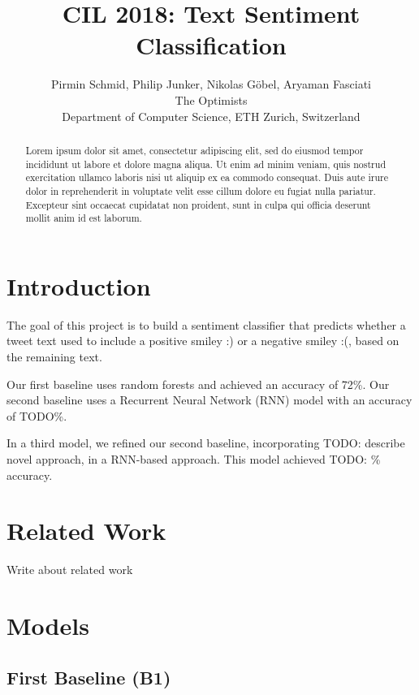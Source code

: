 \documentclass[10pt,conference,compsocconf]{IEEEtran}
\newcommand{\todo}[1]{}
\renewcommand{\todo}[1]{{\color{red} TODO: {#1}}}
\begin{document}
\title{CIL 2018: Text Sentiment Classification}

\author{
  Pirmin Schmid, Philip Junker, Nikolas Göbel, Aryaman Fasciati\\
  The Optimists\\
  Department of Computer Science, ETH Zurich, Switzerland
}

\maketitle

\begin{abstract}
  Lorem ipsum dolor sit amet, consectetur adipiscing elit, sed do
  eiusmod tempor incididunt ut labore et dolore magna aliqua. Ut enim ad
  minim veniam, quis nostrud exercitation ullamco laboris nisi ut
  aliquip ex ea commodo consequat. Duis aute irure dolor in
  reprehenderit in voluptate velit esse cillum dolore eu fugiat nulla
  pariatur. Excepteur sint occaecat cupidatat non proident, sunt in
  culpa qui officia deserunt mollit anim id est laborum.
\end{abstract}


\section{Introduction}

The goal of this project is to build a sentiment classifier
that predicts whether a tweet text used to include a
positive smiley :) or a negative smiley :(,
based on the remaining text.

Our first baseline uses random forests and achieved an accuracy of 72\%.
Our second baseline uses a Recurrent Neural Network (RNN) model with
an accuracy of TODO\%.

In a third model, we refined our second baseline, incorporating
\todo{describe novel approach}, in a RNN-based approach.
This model achieved \todo{\%} accuracy.


\section{Related Work}
Write about related work \cite{go2016mastering}


\section{Models}

\subsection{First Baseline (B1)}
\end{document}
